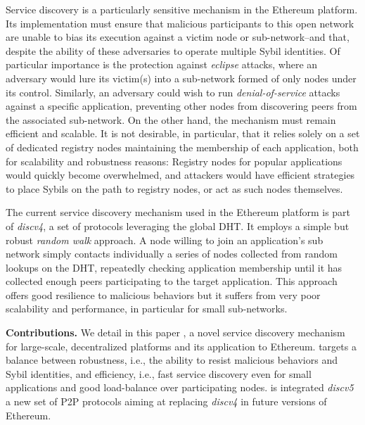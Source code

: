 Service discovery is a particularly sensitive mechanism in the Ethereum platform.
Its implementation must ensure that malicious participants to this open network are unable to bias its execution against a victim node or sub-network--and that, despite the ability of these adversaries to operate multiple Sybil identities.
Of particular importance is the protection against \emph{eclipse} attacks, where an adversary would lure its victim(s) into a sub-network formed of only nodes under its control. %
Similarly, an adversary could wish to run \emph{denial-of-service} attacks against a specific application, preventing other nodes from discovering peers from the associated sub-network.
On the other hand, the mechanism must remain efficient and scalable.
It is not desirable, in particular, that it relies solely on a set of dedicated registry nodes maintaining the membership of each application, both for scalability and robustness reasons: Registry nodes for popular applications would quickly become overwhelmed, and attackers would have efficient strategies to place Sybils on the path to registry nodes, or act as such nodes themselves.

The current service discovery mechanism used in the Ethe\-reum platform is part of \emph{discv4}, a set of protocols leveraging the global DHT.
It employs a simple but robust \emph{random walk} approach.
A node willing to join an application's sub network simply contacts individually a series of nodes collected from random lookups on the DHT, repeatedly checking application membership until it has collected enough peers participating to the target application. %
This approach offers good resilience to malicious behaviors
but it suffers from very poor scalability and performance, in particular for small sub-networks.

\smallskip
\noindent
\textbf{Contributions.}
%
We detail in this paper \sysname, a novel service discovery mechanism for large-scale, decentralized platforms and its application to Ethereum.
\sysname targets a balance between robustness, i.e., the ability to resist malicious behaviors and Sybil identities, and efficiency, i.e., fast service discovery even for small applications and good load-balance over participating nodes.
\sysname is integrated \emph{discv5} a new set of P2P protocols aiming at replacing \emph{discv4} in future versions of Ethereum. 

